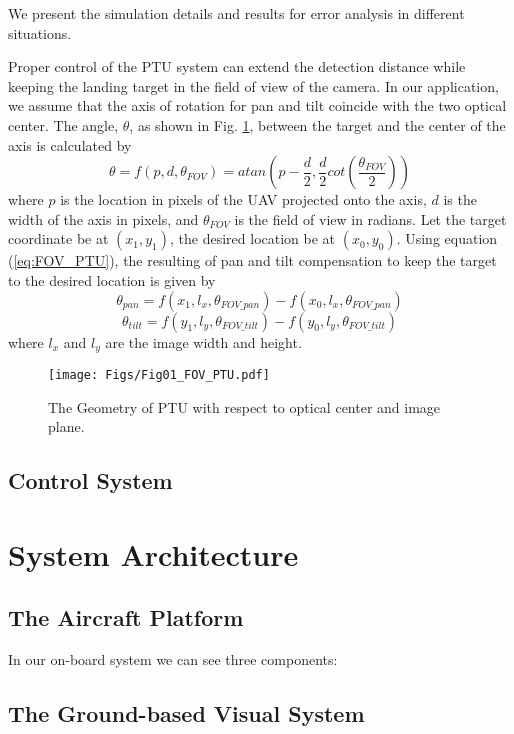 We present the simulation details and results for error analysis in different situations.

Proper control of the PTU system can extend the detection distance while keeping the landing target in the field of view of the camera. In our application, we assume that the axis of rotation for pan and tilt coincide with the two optical center. The angle, $\theta$, as shown in Fig. \ref{fig:Fig01_FOV_PTU}, between the target and the center of the axis is calculated by 
\begin{equation} \label{eq:FOV_PTU}
\theta = f(p,d,\theta_{FOV}) = atan(p-\frac{d}{2},\frac{d}{2}cot(\frac{\theta_{FOV}}{2}))
\end{equation}
where $p$ is the location in pixels of the UAV projected onto the axis, $d$ is the width of the axis in pixels,  and $\theta_{FOV}$ is the field of view in radians. Let the target coordinate be at $(x_1, y_1)$, the desired location be at $(x_0, y_0)$. Using equation (\ref{eq:FOV_PTU}), the resulting of pan and tilt compensation to keep the target to the desired location is given by
$$
\theta_{pan} = f(x_1, l_x, \theta_{FOV\_{pan}}) - f(x_0, l_x, \theta_{FOV\_pan})
$$
$$
\theta_{tilt} = f(y_1, l_y, \theta_{FOV\_tilt}) - f(y_0, l_y, \theta_{FOV\_tilt})
$$
where $l_x$ and $l_y$ are the image width and height.




\begin{figure}[!tb]
	\centering
	\texttt{[image: Figs/Fig01\_FOV\_PTU.pdf]}
	\caption{The Geometry of PTU with respect to optical center and image plane.}
	\label{fig:Fig01_FOV_PTU}
\end{figure}

\subsection{Control System}


\section{System Architecture}
\subsection{The Aircraft Platform}
In our on-board system we can see three components:

\subsection{The Ground-based Visual System}


